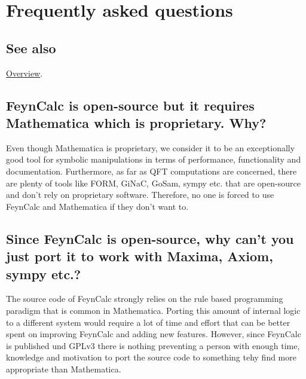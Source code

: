 \documentclass[../FeynCalcManual.tex]{subfiles}
\begin{document}
\hypertarget{frequently asked questions}{
\section{Frequently asked questions}\label{frequently asked questions}}

\subsection{See also}

\hyperlink{toc}{Overview}.

\hypertarget{feyncalc-is-open-source-but-it-requires-mathematica-which-is-proprietary.-why}{%
\subsection{FeynCalc is open-source but it requires Mathematica which is
proprietary.
Why?}\label{feyncalc-is-open-source-but-it-requires-mathematica-which-is-proprietary.-why}}

Even though Mathematica is proprietary, we consider it to be an
exceptionally good tool for symbolic manipulations in terms of
performance, functionality and documentation. Furthermore, as far as QFT
computations are concerned, there are plenty of tools like FORM, GiNaC,
GoSam, sympy etc. that are open-source and don't rely on proprietary
software. Therefore, no one is forced to use FeynCalc and Mathematica if
they don't want to.

\hypertarget{since-feyncalc-is-open-source-why-cant-you-just-port-it-to-work-with-maxima-axiom-sympy-etc.}{%
\subsection{Since FeynCalc is open-source, why can't you just port it to
work with Maxima, Axiom, sympy
etc.?}\label{since-feyncalc-is-open-source-why-cant-you-just-port-it-to-work-with-maxima-axiom-sympy-etc.}}

The source code of FeynCalc strongly relies on the rule based
programming paradigm that is common in Mathematica. Porting this amount
of internal logic to a different system would require a lot of time and
effort that can be better spent on improving FeynCalc and adding new
features. However, since FeynCalc is published und GPLv3 there is
nothing preventing a person with enough time, knowledge and motivation
to port the source code to something tehy find more appropriate than
Mathematica.
\end{document}

